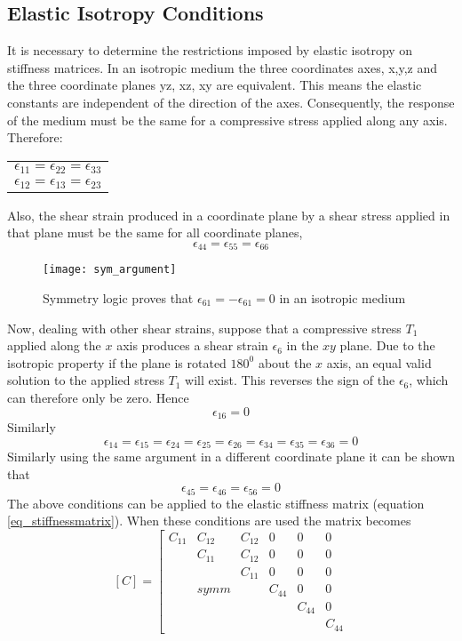 \begin{doublespacing}
\subsection{Elastic Isotropy Conditions}
It is necessary to determine the restrictions imposed by elastic isotropy on stiffness matrices. In an isotropic medium the three coordinates axes, x,y,z and the three coordinate planes yz, xz, xy are equivalent. This means the elastic constants are independent of the direction of the axes. Consequently, the response of the medium must be the same for a compressive stress applied along any axis. Therefore:
\begin{table}[H]
\centering
\begin{tabular}{l}
 $\epsilon_{11}=\epsilon_{22}=\epsilon_{33}$  \\
 $\epsilon_{12}=\epsilon_{13}=\epsilon_{23}$
\end{tabular}
\end{table}
 Also, the shear strain produced in a coordinate plane by a shear stress applied in that plane must be the same for all coordinate planes,
 $$
\epsilon_{44}= \epsilon_{55} = \epsilon_{66}
$$

\begin{figure}[H]
\centering
\texttt{[image: sym\_argument]}
\caption{Symmetry logic proves that $\epsilon_{61}=-\epsilon_{61}=0$ in an isotropic medium}
\label{fig_symmetry}
\end{figure}

Now, dealing with other shear strains, suppose that a compressive stress $T_1$ applied along the $x$ axis produces a shear strain $\epsilon_6$ in the $xy$ plane. Due to the isotropic property if the plane is rotated $180^0$ about the $x$ axis, an equal valid solution to the applied stress $T_1$ will exist. This reverses the sign of the $\epsilon_6$, which can therefore only be zero. Hence
$$
\epsilon_{16}=0
$$
Similarly
$$
\epsilon_{14}=\epsilon_{15}=\epsilon_{24}=\epsilon_{25}=\epsilon_{26}=\epsilon_{34}=\epsilon_{35}=\epsilon_{36}=0
$$
Similarly using the same argument in a different coordinate plane it can be shown that
$$
\epsilon_{45}=\epsilon_{46}=\epsilon_{56}=0
$$
The above conditions can be applied to the elastic stiffness matrix (equation \ref{eq_stiffnessmatrix}). When these conditions are used the matrix becomes
\begin{equation}
\label{eq_isotropicmatrix}
[C] = \left[\begin{array}{cccccc}
 C_{11} & C_{12} &  C_{12} & 0 & 0 & 0\\
          & C_{11} & C_{12} & 0 & 0 & 0 \\
          &          & C_{11} & 0 & 0 & 0 \\
          & symm     &           & C_{44} & 0 & 0 \\
          &          &            &         & C_{44}  & 0 \\
          &          &           &          &           &C_{44}
  

\end{array}
\end{equation}
\end{doublespacing}
